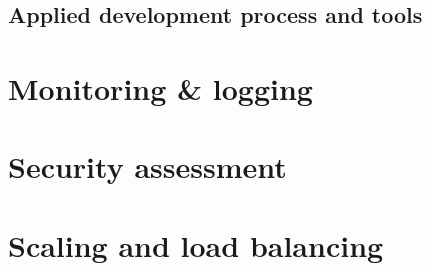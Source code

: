\subsection{Applied development process and tools}
\section{Monitoring \& logging}
\section{Security assessment}
\section{Scaling and load balancing}
